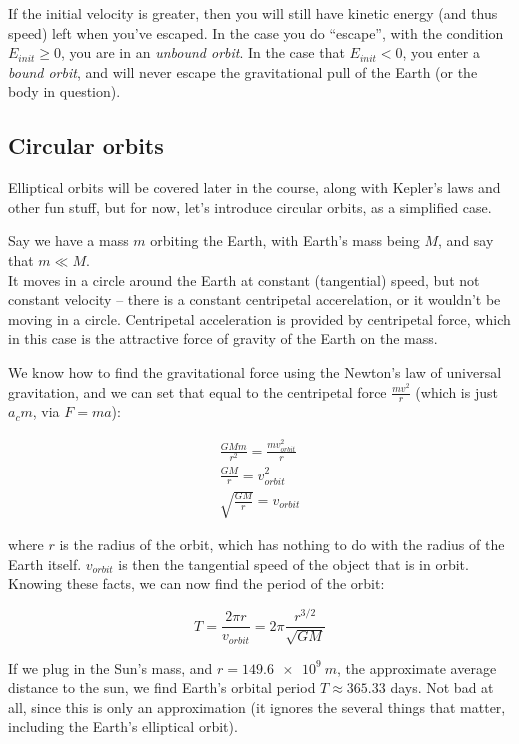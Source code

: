 \documentclass[12pt,a4paper]{report}
\begin{document}
If the initial velocity is greater, then you will still have kinetic energy (and thus speed) left when you've escaped. In the case you do ``escape'', with the condition $E_{init} \ge 0$, you are in an \emph{unbound orbit}. In the case that $E_{init} < 0$, you enter a \emph{bound orbit}, and will never escape the gravitational pull of the Earth (or the body in question).

\subsection{Circular orbits}

Elliptical orbits will be covered later in the course, along with Kepler's laws and other fun stuff, but for now, let's introduce circular orbits, as a simplified case.

Say we have a mass $m$ orbiting the Earth, with Earth's mass being $M$, and say that $m \ll M$.\\
It moves in a circle around the Earth at constant (tangential) speed, but not constant velocity -- there is a constant centripetal accerelation, or it wouldn't be moving in a circle. Centripetal acceleration is provided by centripetal force, which in this case is the attractive force of gravity of the Earth on the mass.

We know how to find the gravitational force using the Newton's law of universal gravitation, and we can set that equal to the centripetal force $\frac{m v^2}{r}$ (which is just $a_c m$, via $F = m a$):

\begin{align}
\frac{G M m}{r^2} = \frac{m v_{orbit}^2}{r}\\
\frac{G M}{r} = v_{orbit}^2\\
\sqrt{\frac{G M}{r}} = v_{orbit}
\end{align}

where $r$ is the radius of the orbit, which has nothing to do with the radius of the Earth itself. $v_{orbit}$ is then the tangential speed of the object that is in orbit. Knowing these facts, we can now find the period of the orbit:

\begin{equation}
T = \frac{2 \pi r}{v_{orbit}} = 2 \pi \frac{r^{3/2}}{\sqrt{G M}}
\end{equation}

If we plug in the Sun's mass, and $r = \SI{149.6e9}{m}$, the approximate average distance to the sun, we find Earth's orbital period $T \approx 365.33$ days. Not bad at all, since this is only an approximation (it ignores the several things that matter, including the Earth's elliptical orbit).
\end{document}
